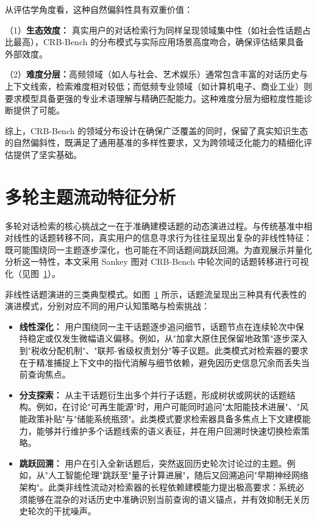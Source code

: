 从评估学角度看，这种自然偏斜性具有双重价值：

（1）\textbf{生态效度：} 真实用户的对话检索行为同样呈现领域集中性（如社会性话题占比最高），CRB-Bench 的分布模式与实际应用场景高度吻合，确保评估结果具备外部效度。

（2）\textbf{难度分层：}高频领域（如人与社会、艺术娱乐）通常包含丰富的对话历史与上下文线索，检索难度相对较低；而低频专业领域（如计算机电子、商业工业）则要求模型具备更强的专业术语理解与精确匹配能力。这种难度分层为细粒度性能诊断提供了可能。

综上，CRB-Bench 的领域分布设计在确保广泛覆盖的同时，保留了真实知识生态的自然偏斜性，既满足了通用基准的多样性要求，又为跨领域泛化能力的精细化评估提供了坚实基础。


\section{多轮主题流动特征分析}
\label{sec:topic_flow}

多轮对话检索的核心挑战之一在于准确建模话题的动态演进过程。与传统基准中相对线性的话题转移不同，真实用户的信息寻求行为往往呈现出复杂的非线性特征：既可能围绕同一主题逐步深化，也可能在不同话题间跳跃回溯。为直观展示并量化分析这一特性，本文采用 Sankey 图对 CRB-Bench 中轮次间的话题转移进行可视化（见图~\ref{fig:topic_flow}）。



\begin{figure}[ht]
    \centering
    \label{fig:topic_flow}
\end{figure}

非线性话题演进的三类典型模式。如图~\ref{fig:topic_flow} 所示，话题流呈现出三种具有代表性的演进模式，分别对应不同的用户认知策略与检索挑战：

\begin{itemize}
    \item \textbf{线性深化：} 用户围绕同一主干话题逐步追问细节，话题节点在连续轮次中保持稳定或仅发生微幅语义偏移。例如，从"加拿大原住民保留地政策"逐步深入到"税收分配机制"、"联邦-省级权责划分"等子议题。此类模式对检索器的要求在于精准捕捉上下文中的指代消解与细节依赖，避免因历史信息冗余而丢失当前查询焦点。
    
    \item \textbf{分支探索：} 从主干话题衍生出多个并行子话题，形成树状或网状的话题结构。例如，在讨论"可再生能源"时，用户可能同时追问"太阳能技术进展"、"风能政策补贴"与"储能系统瓶颈"。此类模式要求检索器具备多焦点上下文建模能力，能够并行维护多个话题线索的语义表征，并在用户回溯时快速切换检索策略。
    
    \item \textbf{跳跃回溯：} 用户在引入全新话题后，突然返回历史轮次讨论过的主题。例如，从"人工智能伦理"跳跃至"量子计算进展"，随后又回溯追问"早期神经网络架构"。此类非线性流动对检索器的长程依赖建模能力提出极高要求：系统必须能够在混杂的对话历史中准确识别当前查询的语义锚点，并有效抑制无关历史轮次的干扰噪声。
\end{itemize}

